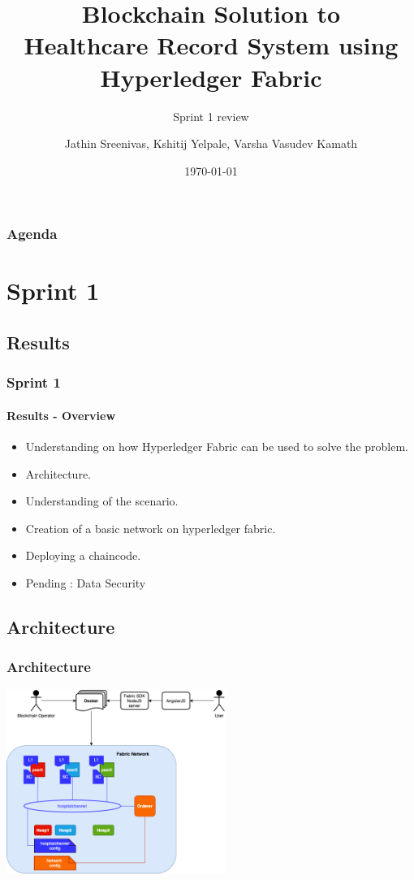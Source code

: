 \documentclass[english,hangout]{beamer}
\title{Blockchain Solution to\\Healthcare Record System using\\Hyperledger Fabric}
\subtitle{Sprint 1 review}
\author{Jathin Sreenivas, Kshitij Yelpale, Varsha Vasudev Kamath}
\date{\today}%
\begin{document}
\begin{frame}
\titlepage
\end{frame}



\begin{frame}
   \frametitle{Agenda}
   \tableofcontents%
\end{frame}




\section{Sprint 1}

\subsection{Results}

\begin{frame}[fragile]
 \frametitle{Sprint 1}
 \framesubtitle{Results - Overview}
  \begin{itemize}
    \item Understanding on how Hyperledger Fabric can be used to solve the problem.
    \item Architecture.
    \item Understanding of the scenario.
    \item Creation of a basic network on hyperledger fabric.
    \item Deploying a chaincode.
    \item Pending : Data Security
  \end{itemize}
\end{frame}

\subsection{Architecture}

\begin{frame}[fragile]
  \frametitle{Architecture}
\begin{center}
        \vspace{-1.2em}
            \includegraphics[height=6cm]{Architecture_v2.png}
        \end{center}
        \vspace{-3mm}
\end{frame}
\end{document}
